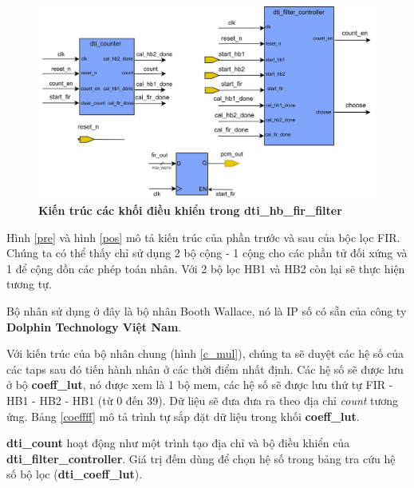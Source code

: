 \begin{figure}[H]
    \centering
    \includegraphics[width=13cm]{Images/Chuong4/hb_fir/fir.png}
    \caption[Kiến trúc các khối điều khiển trong dti\_hb\_fir\_filter]{\bfseries \fontsize{12pt}{0pt}\selectfont Kiến trúc các khối điều khiển trong dti\_hb\_fir\_filter}
    \label{control}
\end{figure}

Hình \ref{pre} và hình \ref{pos} mô tả kiến trúc của phần trước và sau của bộc lọc FIR. Chúng ta có thể thấy chỉ sử dụng 2 bộ cộng - 1 cộng cho các phần tử đối xứng và 1 để cộng dồn các phép toán nhân. Với 2 bộ lọc HB1 và HB2 còn lại sẽ thực hiện tương tự.

Bộ nhân sử dụng ở đây là bộ nhân Booth Wallace, nó là IP số có sẵn của công ty \textbf{Dolphin Technology Việt Nam}.

Với kiến trúc của bộ nhân chung (hình \ref{c_mul}), chúng ta sẽ duyệt các hệ số của các taps sau đó tiến hành nhân ở các thời điểm nhất định. Các hệ số sẽ được lưu ở bộ \textbf{coeff\_lut}, nó được xem là 1 bộ mem, các hệ số sẽ được lưu thứ tự FIR - HB1 - HB2 - HB1 (từ 0 đến 39). Dữ liệu sẽ đưa đưa ra theo địa chỉ \textit{count} tương ứng. Bảng \ref{coeffff} mô tả trình tự sắp đặt dữ liệu trong khối \textbf{coeff\_lut}.

\textbf{dti\_count} hoạt động như một trình tạo địa chỉ và bộ điều khiển của \textbf{dti\_filter\_controller}. Giá trị đếm dùng để chọn hệ số trong bảng tra cứu hệ số bộ lọc (\textbf{dti\_coeff\_lut}).

